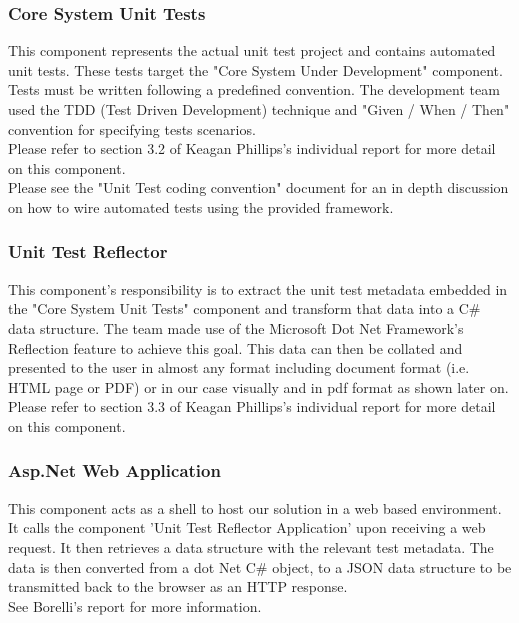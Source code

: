 \documentclass[a4paper,12pt]{article}
\begin{document}
\subsubsection{Core System Unit Tests}
This component represents the actual unit test project and contains automated unit tests. These tests target the "Core System Under Development" component.\\
\linebreak  
Tests must be written following a predefined convention\cite{UTconvention}. The development team used the TDD\cite{tdd} (Test Driven Development) technique and "Given / When / Then"\cite{gwt} convention for specifying tests scenarios.\\
\linebreak  
Please refer to section 3.2 of Keagan Phillips's individual report\cite{reportKeagan} for more detail on this component.\\
\linebreak  
Please see the "Unit Test coding convention" document for an in depth discussion on how to wire automated tests using the provided framework.\cite{UTconvention}

\subsubsection{Unit Test Reflector}
This component's responsibility is to extract the unit test metadata embedded in the "Core System Unit Tests" component and transform that data into a C\# data structure. The team made use of the Microsoft Dot Net Framework's Reflection\cite{reflection} feature to achieve this goal. This data can then be collated and presented to the user in almost any format including document format (i.e. HTML page or PDF) or in our case visually and in pdf format as shown later on.\\
\linebreak  
Please refer to section 3.3 of Keagan Phillips's individual report\cite{reportKeagan} for more detail on this component.\\ 

\subsubsection{Asp.Net Web Application}
This component acts as a shell to host our solution in a web based environment. It calls the component 'Unit Test Reflector Application' upon receiving a web request. It then retrieves a data structure with the relevant test metadata. The data is then converted from a dot Net C\# object, to a JSON\cite{json} data structure to be transmitted back to the browser as an HTTP response.\\
\linebreak  
See Borelli’s report for more information.\cite{boreli}
\end{document}
